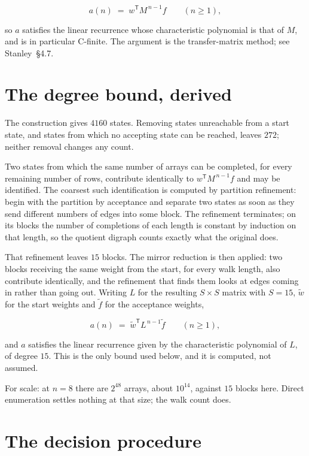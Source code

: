 \documentclass[11pt]{article}
\theoremstyle{definition}
\begin{document}
\[a(n) \;=\; w^{\mathsf T} M^{\,n-1} f \qquad (n \ge 1),\]

so $a$ satisfies the linear recurrence whose characteristic polynomial is that of $M$, and is in particular C-finite. The argument is the transfer-matrix method; see Stanley~\S4.7.

\section{The degree bound, derived}

The construction gives $4160$ states. Removing states unreachable from a start state, and states from which no accepting state can be reached, leaves $272$; neither removal changes any count.

Two states from which the same number of arrays can be completed, for every remaining number of rows, contribute identically to $w^{\mathsf T}M^{\,n-1}f$ and may be identified. The coarsest such identification is computed by partition refinement: begin with the partition by acceptance and separate two states as soon as they send different numbers of edges into some block. The refinement terminates; on its blocks the number of completions of each length is constant by induction on that length, so the quotient digraph counts exactly what the original does.

That refinement leaves $15$ blocks. The mirror reduction is then applied: two blocks receiving the same weight from the start, for every walk length, also contribute identically, and the refinement that finds them looks at edges coming in rather than going out. Writing $L$ for the resulting $S \times S$ matrix with $S = 15$, $\tilde w$ for the start weights and $\tilde f$ for the acceptance weights,

\[a(n) \;=\; \tilde w^{\mathsf T} L^{\,n-1} \tilde f \qquad (n \ge 1),\]

and $a$ satisfies the linear recurrence given by the characteristic polynomial of $L$, of degree $15$. This is the only bound used below, and it is computed, not assumed.

For scale: at $n = 8$ there are $2^{48}$ arrays, about $10^{14}$, against $15$ blocks here. Direct enumeration settles nothing at that size; the walk count does.

\section{The decision procedure}
\end{document}
